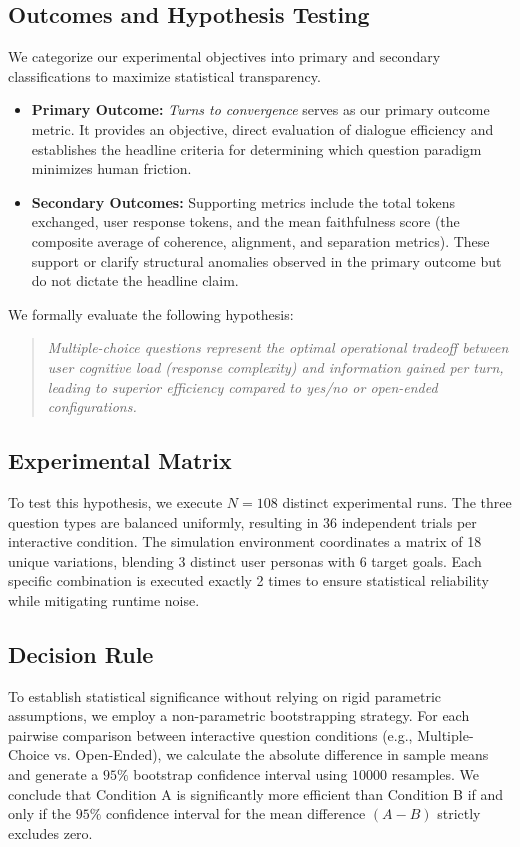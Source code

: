 \subsection{Outcomes and Hypothesis Testing}
We categorize our experimental objectives into primary and secondary classifications to maximize statistical transparency.
\begin{itemize}
    \item \textbf{Primary Outcome:} 
    \textit{Turns to convergence} serves as our primary outcome metric. 
    It provides an objective, direct evaluation of dialogue efficiency and establishes the headline criteria for determining which question paradigm minimizes human friction.
    \item \textbf{Secondary Outcomes:} 
    Supporting metrics include the total tokens exchanged, user response tokens, and the mean faithfulness score (the composite average of coherence, alignment, and separation metrics). 
    These support or clarify structural anomalies observed in the primary outcome but do not dictate the headline claim.
\end{itemize}

We formally evaluate the following hypothesis: 
\begin{quote}
\textit{Multiple-choice questions represent the optimal operational tradeoff between user cognitive load (response complexity) and information gained per turn, leading to superior efficiency compared to yes/no or open-ended configurations.}
\end{quote}

\subsection{Experimental Matrix}
To test this hypothesis, we execute $N=108$ distinct experimental runs. 
The three question types are balanced uniformly, resulting in 36 independent trials per interactive condition. 
The simulation environment coordinates a matrix of 18 unique variations, blending 3 distinct user personas with 6 target goals.
Each specific combination is executed exactly 2 times to ensure statistical reliability while mitigating runtime noise.

\subsection{Decision Rule}
To establish statistical significance without relying on rigid parametric assumptions, we employ a non-parametric bootstrapping strategy. 
For each pairwise comparison between interactive question conditions (e.g., Multiple-Choice vs. Open-Ended), we calculate the absolute difference in sample means and generate a $95\%$ bootstrap confidence interval using $10000$ resamples.
We conclude that Condition A is significantly more efficient than Condition B if and only if the $95\%$ confidence interval for the mean difference $(A - B)$ strictly excludes zero. 


